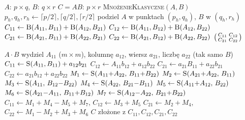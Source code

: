 \documentclass[10pt,a4paper]{article}
\begin{document}
\begin{minipage}[t]{0.495\textwidth}
\begin{algorithm}[H]
\caption{\textsc{Binét}$(A,B)$ (\textsc{B} = wywołanie rekurencyjne)}
\begin{algorithmic}[1]
\Require $A$: $p\times q$, $B$: $q\times r$
\Ensure $C=AB$: $p\times r$
  \State \Return \textsc{MnożenieKlasyczne}$(A,B)$
\EndIf
\State $p_h,q_h,r_h \gets \lceil p/2\rceil,\lceil q/2\rceil,\lceil r/2\rceil$
\State podziel $A$ w punktach $(p_h,q_h)$, $B$ w $(q_h,r_h)$
\State $C_{11}\gets \textsc{B}(A_{11},B_{11})+\textsc{B}(A_{12},B_{21})$
\State $C_{12}\gets \textsc{B}(A_{11},B_{12})+\textsc{B}(A_{12},B_{22})$
\State $C_{21}\gets \textsc{B}(A_{21},B_{11})+\textsc{B}(A_{22},B_{21})$
\State $C_{22}\gets \textsc{B}(A_{21},B_{12})+\textsc{B}(A_{22},B_{22})$
\State \Return $\begin{psmallmatrix}C_{11}&C_{12}\\C_{21}&C_{22}\end{psmallmatrix}$
\end{algorithmic}
\end{algorithm}
\end{minipage}\hfill
\begin{minipage}[t]{0.495\textwidth}
\begin{algorithm}[H]
\caption{\textsc{Strassen}$(A,B)$, $n\times n$ (\textsc{S} = wywołanie rekurencyjne)}
\begin{algorithmic}[1]
 \State \Return $A\cdot B$ \EndIf
{}
  \State wydziel $A_{11}$ ($m{\times}m$), kolumnę $a_{12}$, wiersz $a_{21}$, liczbę $a_{22}$ (tak samo $B$)
  \State $C_{11}\gets \textsc{S}(A_{11},B_{11})+a_{12}b_{21}$
  \State $C_{12}\gets A_{11}b_{12}+a_{12}b_{22}$
  \State $C_{21}\gets a_{21}B_{11}+a_{22}b_{21}$
  \State $C_{22}\gets a_{21}b_{12}+a_{22}b_{22}$
\Else
  \State $M_1\gets \textsc{S}(A_{11}{+}A_{22},\,B_{11}{+}B_{22})$
  \State $M_2\gets \textsc{S}(A_{21}{+}A_{22},\,B_{11})$
  \State $M_3\gets \textsc{S}(A_{11},\,B_{12}{-}B_{22})$
  \State $M_4\gets \textsc{S}(A_{22},\,B_{21}{-}B_{11})$
  \State $M_5\gets \textsc{S}(A_{11}{+}A_{12},\,B_{22})$
  \State $M_6\gets \textsc{S}(A_{21}{-}A_{11},\,B_{11}{+}B_{12})$
  \State $M_7\gets \textsc{S}(A_{12}{-}A_{22},\,B_{21}{+}B_{22})$
  \State $C_{11}\gets M_1{+}M_4{-}M_5{+}M_7$, \; $C_{12}\gets M_3{+}M_5$
  \State $C_{21}\gets M_2{+}M_4$, \; $C_{22}\gets M_1{-}M_2{+}M_3{+}M_6$
\EndIf
\State \Return $C$ złożone z $C_{11},C_{12},C_{21},C_{22}$
\end{algorithmic}
\end{algorithm}
\end{minipage}
\end{document}
